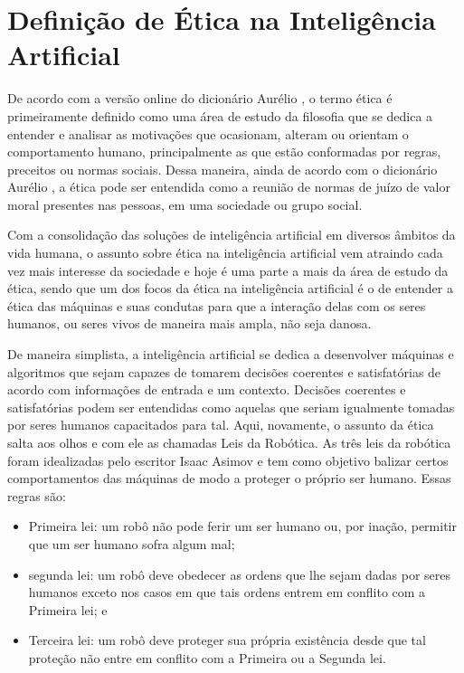 \documentclass{article}
\begin{document}
%
\section*{Definição de Ética na Inteligência Artificial}
De acordo com a versão online do dicionário Aurélio \cite{aurelio_online}, o termo ética é primeiramente definido como uma área de estudo da filosofia que se dedica a entender e analisar as motivações que ocasionam, alteram ou orientam o comportamento humano, principalmente as que estão conformadas por regras, preceitos ou normas sociais. Dessa maneira, ainda de acordo com o dicionário Aurélio \cite{aurelio_online}, a ética pode ser entendida como a reunião de normas de juízo de valor moral presentes nas pessoas, em uma sociedade ou grupo social. 

Com a consolidação das soluções de inteligência artificial em diversos âmbitos da vida humana, o assunto sobre ética na inteligência artificial vem atraindo cada vez mais interesse da sociedade e hoje é uma parte a mais da área de estudo da ética, sendo que um dos focos da ética na inteligência artificial é o de entender a ética das máquinas e suas condutas para que a interação delas com os seres humanos, ou seres vivos de maneira mais ampla, não seja danosa.

De maneira simplista, a inteligência artificial se dedica a desenvolver máquinas e algoritmos que sejam capazes de tomarem decisões coerentes e satisfatórias de acordo com informações de entrada e um contexto. Decisões coerentes e satisfatórias podem ser entendidas como aquelas que seriam igualmente tomadas por seres humanos capacitados para tal. Aqui, novamente, o assunto da ética salta aos olhos e com ele as chamadas Leis da Robótica. As três leis da robótica foram idealizadas pelo escritor Isaac Asimov e tem como objetivo balizar certos comportamentos das máquinas de modo a proteger o próprio ser humano. Essas regras são:
\begin{itemize}
	\item Primeira lei: um robô não pode ferir um ser humano ou, por inação, permitir que um ser humano sofra algum mal;
	\item segunda lei: um robô deve obedecer as ordens que lhe sejam dadas por seres humanos exceto nos casos em que tais ordens entrem em conflito com a Primeira lei; e
	\item Terceira lei: um robô deve proteger sua própria existência desde que tal proteção não entre em conflito com a Primeira ou a Segunda lei.
\end{itemize}
\end{document}
